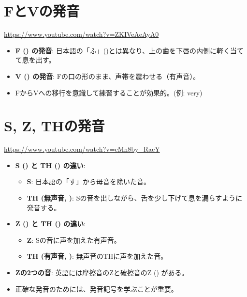 \documentclass{jlreq}
\begin{document}
\section{FとVの発音}
\href{https://www.youtube.com/watch?v=ZKIVeAeAyA0}{https://www.youtube.com/watch?v=ZKIVeAeAyA0}
\begin{itemize}
    \item \textbf{F (\textipa{[f]}) の発音}: 日本語の「ふ」(\textipa{[\textphi]})とは異なり、上の歯を下唇の内側に軽く当てて息を出す。
    \item \textbf{V (\textipa{[v]}) の発音}: Fの口の形のまま、声帯を震わせる（有声音）。
    \item FからVへの移行を意識して練習することが効果的。(例: very)
\end{itemize}

\section{S, Z, THの発音}
\href{https://www.youtube.com/watch?v=eMn8by_RacY}{https://www.youtube.com/watch?v=eMn8by\_RacY}
\begin{itemize}
    \item \textbf{S (\textipa{[s]}) と TH (\textipa{[\texttheta]}) の違い}:
    \begin{itemize}
        \item \textbf{S}: 日本語の「す」から母音を除いた音。
        \item \textbf{TH (無声音, \textipa{[\texttheta]})}: Sの音を出しながら、舌を少し下げて息を漏らすように発音する。
    \end{itemize}
    \item \textbf{Z (\textipa{[z]}) と TH (\textipa{[D]}) の違い}:
    \begin{itemize}
        \item \textbf{Z}: Sの音に声を加えた有声音。
        \item \textbf{TH (有声音, \textipa{[D]})}: 無声音のTHに声を加えた音。
    \end{itemize}
    \item \textbf{Zの2つの音}: 英語には摩擦音のZと破擦音のZ (\textipa{[dz]}) がある。
    \item 正確な発音のためには、発音記号を学ぶことが重要。
\end{itemize}
\end{document}
